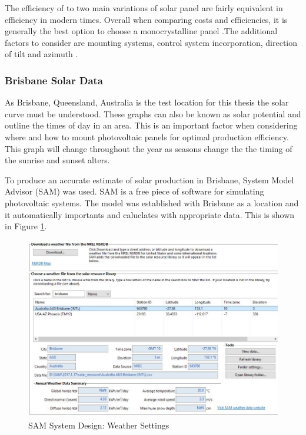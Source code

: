 The efficiency of to two main variations of solar panel are fairly equivalent in efficiency in modern times. Overall when comparing costs and efficiencies, it is generally the best option to choose a monocrystalline panel \cite{Haberlin2012}.The additional factors to consider are mounting systems, control system incorporation, direction of tilt and azimuth \cite{Haberlin2012}.  


\subsubsection{Brisbane Solar Data}

As Brisbane, Queensland, Australia is the test location for this thesis the solar curve must be understood. These graphs can also be known as solar potential and outline the times of day in an area. This is an important factor when considering where and how to mount photovoltaic panels for optimal production efficiency. This graph will change throughout the year as seasons change the the timing of the sunrise and sunset alters. 
\newline

To produce an accurate estimate of solar production in Brisbane, System Model Advisor (SAM) was used. SAM is a free piece of software for simulating photovoltaic systems. The model was established with Brisbane as a location and it automatically importants and caluclates with appropriate data. This is shown in Figure \ref{fig:SAM-test1-weather}. 

\begin{figure}[H]
	\hfill\includegraphics[width = 120mm]{images/sam/test1-weather}\hspace*{\fill}
	\caption{SAM System Design: Weather Settings} 
	\label{fig:SAM-test1-weather}
\end{figure}


